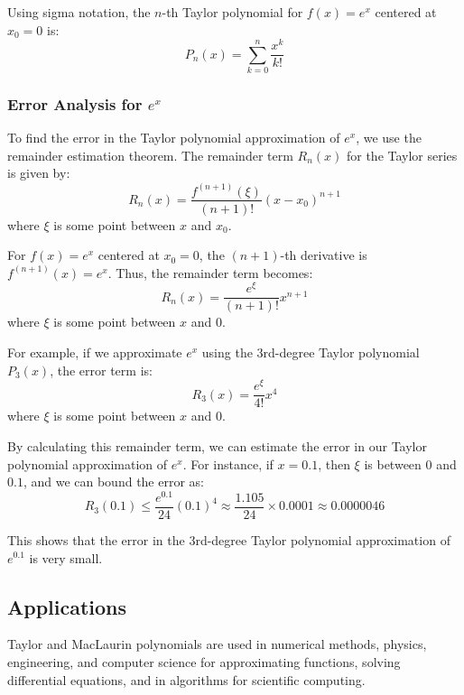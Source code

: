 \documentclass{article}
\begin{document}
Using sigma notation, the \( n \)-th Taylor polynomial for \( f(x) = e^x \) centered at \( x_0 = 0 \) is:
\[ P_n(x) = \sum_{k=0}^{n} \frac{x^k}{k!} \]

\subsubsection*{Error Analysis for \( e^x \)}

To find the error in the Taylor polynomial approximation of \( e^x \), we use the remainder estimation theorem. The remainder term \( R_n(x) \) for the Taylor series is given by:
\[ R_n(x) = \frac{f^{(n+1)}(\xi)}{(n+1)!} (x - x_0)^{n+1} \]
where \( \xi \) is some point between \( x \) and \( x_0 \).

For \( f(x) = e^x \) centered at \( x_0 = 0 \), the \((n+1)\)-th derivative is \( f^{(n+1)}(x) = e^x \). Thus, the remainder term becomes:
\[ R_n(x) = \frac{e^{\xi}}{(n+1)!} x^{n+1} \]
where \( \xi \) is some point between \( x \) and \( 0 \).

For example, if we approximate \( e^x \) using the 3rd-degree Taylor polynomial \( P_3(x) \), the error term is:
\[ R_3(x) = \frac{e^{\xi}}{4!} x^4 \]
where \( \xi \) is some point between \( x \) and \( 0 \).

By calculating this remainder term, we can estimate the error in our Taylor polynomial approximation of \( e^x \). For instance, if \( x = 0.1 \), then \( \xi \) is between \( 0 \) and \( 0.1 \), and we can bound the error as:
\[ R_3(0.1) \leq \frac{e^{0.1}}{24} (0.1)^4 \approx \frac{1.105}{24} \times 0.0001 \approx 0.0000046 \]

This shows that the error in the 3rd-degree Taylor polynomial approximation of \( e^{0.1} \) is very small.



\subsection*{Applications}
Taylor and MacLaurin polynomials are used in numerical methods, physics, engineering, and computer science for approximating functions, solving differential equations, and in algorithms for scientific computing.
\end{document}
